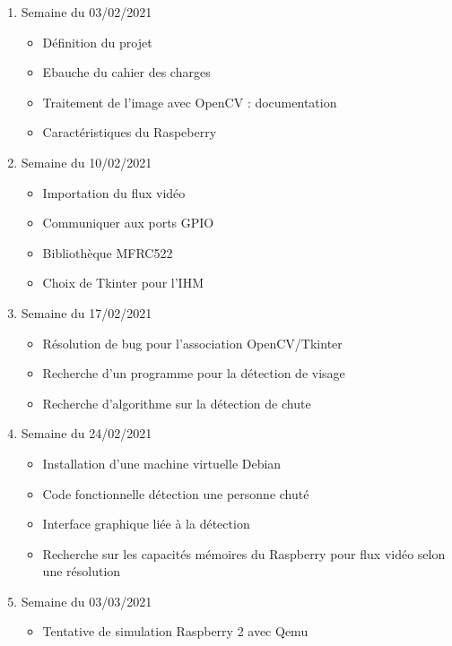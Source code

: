\documentclass[a4paper]{report}
\begin{document}
    \begin{enumerate}
        \item Semaine du 03/02/2021
            \begin{itemize}
                \item Définition du projet
                \item Ebauche du cahier des charges
                \item Traitement de l'image avec OpenCV : documentation
                \item Caractéristiques du Raspeberry
            \end{itemize}
        \item Semaine du 10/02/2021
            \begin{itemize}
                \item Importation du flux vidéo
                \item Communiquer aux ports GPIO 
                \item Bibliothèque MFRC522 
                \item Choix de Tkinter pour l'IHM
            \end{itemize}
        \item Semaine du 17/02/2021
            \begin{itemize}
                \item Résolution de bug pour l'association OpenCV/Tkinter 
                \item Recherche d'un programme pour la détection de visage
                \item Recherche d'algorithme sur la détection de chute
            \end{itemize}
        \item Semaine du 24/02/2021
            \begin{itemize}
                \item Installation d'une machine virtuelle Debian
                \item Code fonctionnelle détection une personne chuté 
                \item Interface graphique liée à la détection
                \item Recherche sur les capacités mémoires du Raspberry pour flux vidéo selon une résolution
            \end{itemize}
        \item Semaine du 03/03/2021
            \begin{itemize}
                \item Tentative de simulation Raspberry 2 avec Qemu

\end{itemize}
\end{enumerate}
\end{document}
